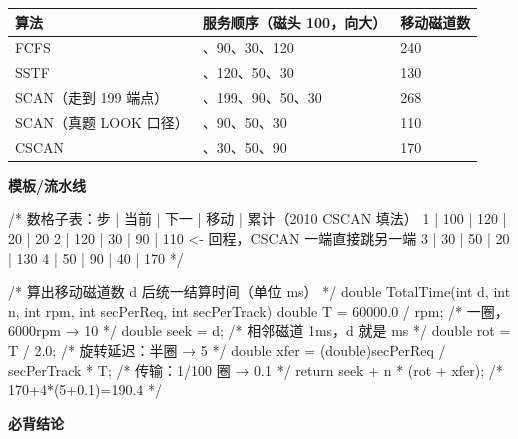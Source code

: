 \documentclass[10pt,a4paper]{ctexart}
\begin{document}
\begin{center}\small
\begin{tabularx}{\linewidth}{@{}>{\raggedright\arraybackslash}X>{\raggedright\arraybackslash}Xl@{}}
\toprule
算法 & 服务顺序（磁头 100，向大） & 移动磁道数 \\
\midrule
FCFS & 50、90、30、120 & 240 \\
SSTF & 90、120、50、30 & 130 \\
SCAN（走到 199 端点） & 120、199、90、50、30 & 268 \\
SCAN（真题 LOOK 口径） & 120、90、50、30 & 110 \\
CSCAN & 120、30、50、90 & 170 \\
\bottomrule
\end{tabularx}
\end{center}

\textbf{模板/流水线}

\begin{codebox}
/* 数格子表：步 | 当前 | 下一 | 移动 | 累计（2010 CSCAN 填法）
    1 | 100 | 120 |  20 |  20
    2 | 120 |  30 |  90 | 110   <- 回程，CSCAN 一端直接跳另一端
    3 |  30 |  50 |  20 | 130
    4 |  50 |  90 |  40 | 170          */

/* 算出移动磁道数 d 后统一结算时间（单位 ms） */
double TotalTime(int d, int n, int rpm, int secPerReq, int secPerTrack) {
    double T    = 60000.0 / rpm;                        /* 一圈，6000rpm → 10 */
    double seek = d;                                    /* 相邻磁道 1ms，d 就是 ms */
    double rot  = T / 2.0;                              /* 旋转延迟：半圈 → 5 */
    double xfer = (double)secPerReq / secPerTrack * T;  /* 传输：1/100 圈 → 0.1 */
    return seek + n * (rot + xfer);                     /* 170+4*(5+0.1)=190.4 */
}
\end{codebox}




\textbf{必背结论}
\end{document}
